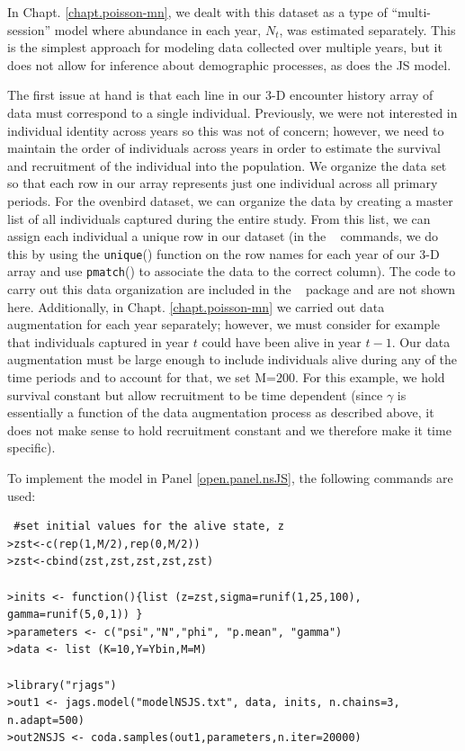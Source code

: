 In Chapt. \ref{chapt.poisson-mn}, we dealt with this dataset as a type
of ``multi-session'' 
model where abundance in each year, $N_{t}$, was estimated
separately. This 
is the simplest approach for modeling data
collected over multiple years, but it does not allow for inference
about demographic processes, as does the JS model.


The first issue at hand is that each line in our 3-D encounter history
array of
data must correspond to a single individual.  Previously, we were not
interested in individual identity across years so this was not of
concern; however, we need to maintain the order of individuals across years
in order to estimate the survival and recruitment of the individual into the population.
We organize the data set so that each row in our
array represents just one individual across all primary periods.
For the ovenbird dataset, we
can organize the data by creating a master list of all individuals
captured during the entire study.  From this list, we can assign each
individual a unique row in our dataset (in the \R~ commands,
we do this by using the \mbox{\tt unique}() function 
on the row names
for each year of our 3-D array and use \mbox{\tt pmatch}()
to associate the data to the correct column).  The code to carry out
this data organization are included in the \scrbook~ package and are not
shown here.  Additionally, in
Chapt. \ref{chapt.poisson-mn} we carried out data augmentation for each year separately;
however, we must consider for example that individuals captured in
year $t$ could have been alive in year $t-1$.  Our data
augmentation must be large enough to include individuals alive during
any of the time periods and to account for that, we set M=200.  For this example,
we hold survival constant but allow recruitment to be time dependent
(since $\gamma$ is essentially a function of the data augmentation
process as described above, it does not make sense to hold recruitment constant and we
therefore make it time specific).

To implement the model in Panel \ref{open.panel.nsJS}, the following commands 
are used:

{\small
\begin{verbatim}
 #set initial values for the alive state, z
>zst<-c(rep(1,M/2),rep(0,M/2))
>zst<-cbind(zst,zst,zst,zst,zst)

>inits <- function(){list (z=zst,sigma=runif(1,25,100), gamma=runif(5,0,1)) }
>parameters <- c("psi","N","phi", "p.mean", "gamma")
>data <- list (K=10,Y=Ybin,M=M)

>library("rjags")
>out1 <- jags.model("modelNSJS.txt", data, inits, n.chains=3, n.adapt=500)
>out2NSJS <- coda.samples(out1,parameters,n.iter=20000)
\end{verbatim}
}

